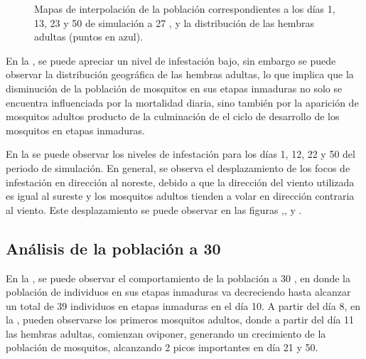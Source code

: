 \begin{figure}[!htbp]
    \caption{\label{fig:niveles-infestacion-27} Mapas de interpolación de la población correspondientes a los días 1, 13, 23 y 50 de simulación a 27 \textcelsius, y la distribución de las hembras adultas (puntos en azul). }
\end{figure}

En la , se puede apreciar un nivel de infestación bajo, sin
embargo se puede observar la distribución geográfica de las hembras adultas, lo que implica que la
disminución de la población de mosquitos en sus etapas inmaduras no solo se encuentra influenciada
por la mortalidad diaria, sino también por la aparición de mosquitos adultos producto de la culminación de el ciclo de desarrollo de los mosquitos en etapas inmaduras.

En la  se puede observar los niveles de infestación
para los días 1, 12, 22 y 50 del periodo de simulación. En general, se observa el
desplazamiento de los focos de infestación en dirección al noreste, debido a que la dirección del
viento utilizada es igual al sureste y los mosquitos adultos tienden a volar en dirección
contraria al viento. Este desplazamiento se puede observar en las figuras
,,
 y .

\subsection{Análisis de la población a 30\textcelsius}
En la , se puede observar el comportamiento de la población a
30 \textcelsius, en donde la población de individuos en sus etapas inmaduras va decreciendo hasta
alcanzar un total de 39 individuos en etapas inmaduras en el día 10. A partir del día 8, en la
, pueden observarse los primeros mosquitos adultos, donde a
partir del día 11 las hembras adultas, comienzan oviponer, generando un crecimiento de la
población de mosquitos, alcanzando 2 picos importantes en día 21 y 50.

